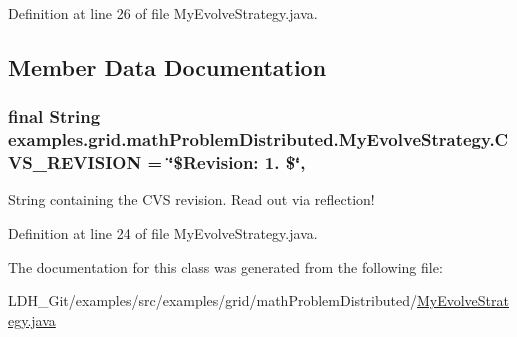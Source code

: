 Definition at line 26 of file My\-Evolve\-Strategy.\-java.



\subsection{Member Data Documentation}
\hypertarget{classexamples_1_1grid_1_1math_problem_distributed_1_1_my_evolve_strategy_a011ac17959b58ed3c529fea369fc0374}{
\subsubsection[{C\-V\-S\-\_\-\-R\-E\-V\-I\-S\-I\-O\-N}]{\setlength{\rightskip}{0pt plus 5cm}final String examples.\-grid.\-math\-Problem\-Distributed.\-My\-Evolve\-Strategy.\-C\-V\-S\-\_\-\-R\-E\-V\-I\-S\-I\-O\-N = \char`\"{}\$Revision\-: 1. \$\char`\"{}\hspace{0.3cm}{\ttfamily [static]}, {\ttfamily [private]}}}\label{classexamples_1_1grid_1_1math_problem_distributed_1_1_my_evolve_strategy_a011ac17959b58ed3c529fea369fc0374}
String containing the C\-V\-S revision. Read out via reflection! 

Definition at line 24 of file My\-Evolve\-Strategy.\-java.



The documentation for this class was generated from the following file\-:\begin{DoxyCompactItemize}
\item 
L\-D\-H\-\_\-\-Git/examples/src/examples/grid/math\-Problem\-Distributed/\hyperlink{math_problem_distributed_2_my_evolve_strategy_8java}{My\-Evolve\-Strategy.\-java}\end{DoxyCompactItemize}

